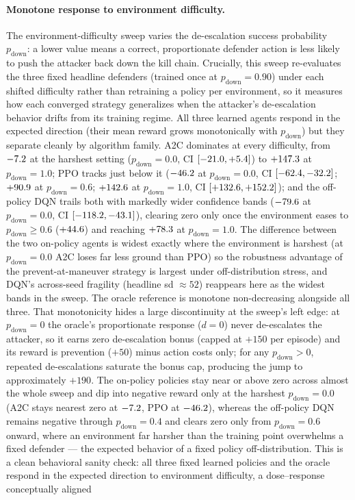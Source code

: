 \paragraph{Monotone response to environment difficulty.} The environment-difficulty sweep varies the de-escalation success probability $p_{\mathrm{down}}$: a lower value means a correct, proportionate defender action is less likely to push the attacker back down the kill chain. Crucially, this sweep re-evaluates the three fixed headline defenders (trained once at $p_{\mathrm{down}} = 0.90$) under each shifted difficulty rather than retraining a policy per environment, so it measures how each converged strategy generalizes when the attacker's de-escalation behavior drifts from its training regime. All three learned agents respond in the expected direction (their mean reward grows monotonically with $p_{\mathrm{down}}$) but they separate cleanly by algorithm family. A2C dominates at every difficulty, from $-7.2$ at the harshest setting ($p_{\mathrm{down}} = 0.0$, CI $[-21.0, +5.4]$) to $+147.3$ at $p_{\mathrm{down}} = 1.0$; PPO tracks just below it ($-46.2$ at $p_{\mathrm{down}} = 0.0$, CI $[-62.4, -32.2]$; $+90.9$ at $p_{\mathrm{down}} = 0.6$; $+142.6$ at $p_{\mathrm{down}} = 1.0$, CI $[+132.6, +152.2]$); and the off-policy DQN trails both with markedly wider confidence bands ($-79.6$ at $p_{\mathrm{down}} = 0.0$, CI $[-118.2, -43.1]$), clearing zero only once the environment eases to $p_{\mathrm{down}} \geq 0.6$ ($+44.6$) and reaching $+78.3$ at $p_{\mathrm{down}} = 1.0$. The difference between the two on-policy agents is widest exactly where the environment is harshest (at $p_{\mathrm{down}} = 0.0$ A2C loses far less ground than PPO) so the robustness advantage of the prevent-at-maneuver strategy is largest under off-distribution stress, and DQN's across-seed fragility (headline sd $\approx 52$) reappears here as the widest bands in the sweep. The oracle reference is monotone non-decreasing alongside all three. That monotonicity hides a large discontinuity at the sweep's left edge: at $p_{\mathrm{down}} = 0$ the oracle's proportionate response ($d = 0$) never de-escalates the attacker, so it earns zero de-escalation bonus (capped at $+150$ per episode) and its reward is prevention ($+50$) minus action costs only; for any $p_{\mathrm{down}} > 0$, repeated de-escalations saturate the bonus cap, producing the jump to approximately $+190$. The on-policy policies stay near or above zero across almost the whole sweep and dip into negative reward only at the harshest $p_{\mathrm{down}} = 0.0$ (A2C stays nearest zero at $-7.2$, PPO at $-46.2$), whereas the off-policy DQN remains negative through $p_{\mathrm{down}} = 0.4$ and clears zero only from $p_{\mathrm{down}} = 0.6$ onward, where an environment far harsher than the training point overwhelms a fixed defender --- the expected behavior of a fixed policy off-distribution. This is a clean behavioral sanity check: all three fixed learned policies and the oracle respond in the expected direction to environment difficulty, a dose--response conceptually aligned 